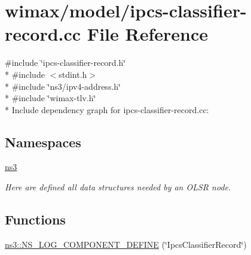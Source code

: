 \hypertarget{ipcs-classifier-record_8cc}{}\section{wimax/model/ipcs-\/classifier-\/record.cc File Reference}
\label{ipcs-classifier-record_8cc}
{\ttfamily \#include \char`\"{}ipcs-\/classifier-\/record.\+h\char`\"{}}\\*
{\ttfamily \#include $<$stdint.\+h$>$}\\*
{\ttfamily \#include \char`\"{}ns3/ipv4-\/address.\+h\char`\"{}}\\*
{\ttfamily \#include \char`\"{}wimax-\/tlv.\+h\char`\"{}}\\*
Include dependency graph for ipcs-\/classifier-\/record.cc\+:
\subsection*{Namespaces}
\begin{DoxyCompactItemize}
\item 
 \hyperlink{namespacens3}{ns3}
\begin{DoxyCompactList}\small\item\em Here are defined all data structures needed by an O\+L\+SR node. \end{DoxyCompactList}\end{DoxyCompactItemize}
\subsection*{Functions}
\begin{DoxyCompactItemize}
\item 
\hyperlink{namespacens3_a0fc70f24b743b9c8694b0b5d6ef0351c}{ns3\+::\+N\+S\+\_\+\+L\+O\+G\+\_\+\+C\+O\+M\+P\+O\+N\+E\+N\+T\+\_\+\+D\+E\+F\+I\+NE} (\char`\"{}Ipcs\+Classifier\+Record\char`\"{})
\end{DoxyCompactItemize}
